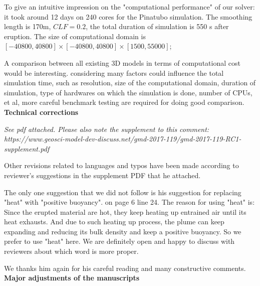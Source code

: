 \documentclass[10pt,a4paper]{article}
\begin{document}
To give an intuitive impression on the "computational performance" of our solver: it took around 12 days on 240 cores for the Pinatubo simulation. The smoothing length is 170m, $CLF=0.2$, the total duration of simulation is 550 s after eruption. The size of computational domain is $[-40800, 40800] \times [-40800, 40800] \times [1500, 55000] $;

A comparison between all existing 3D models in terms of computational cost would be interesting. 
considering many factors could influence the total simulation time, such as resolution, size of the computational domain, duration of simulation, type of hardwares on which the simulation is done, number of CPUs, et al, more careful benchmark testing are required for doing good comparison.
\\[12pt] 


\textbf{\large Technical corrections}

\textit{See pdf attached. Please also note the supplement to this comment: https://www.geosci-model-dev-discuss.net/gmd-2017-119/gmd-2017-119-RC1-supplement.pdf}

Other revisions related to languages and typos have been made according to reviewer's suggestions in the supplement PDF that he attached.

The only one suggestion that we did not follow is his suggestion for replacing "heat" with "positive buoyancy". on page 6 line 24. 
The reason for using "heat" is: Since the erupted material are hot, they keep heating up entrained air until its heat exhausts. And due to such heating up process, the plume can keep expanding and reducing its bulk density and keep a positive buoyancy. 
So we prefer to use "heat" here. We are definitely open and happy to discuss with reviewers about which word is more proper.
 
We thanks him again for his careful reading and many constructive comments.\\[12pt]

\textbf{\large Major adjustments of the manuscripts}
\end{document}
